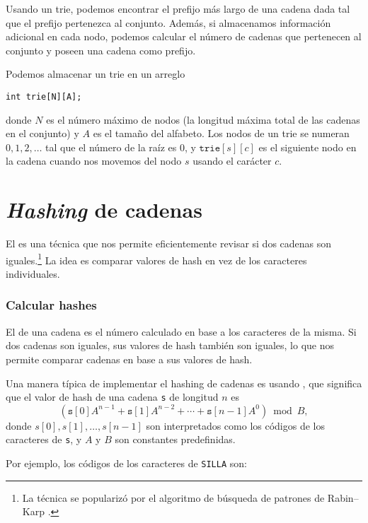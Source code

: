 Usando un trie, podemos encontrar el prefijo más largo de una cadena dada
tal que el prefijo pertenezca al conjunto. Además, si almacenamos
información adicional en cada nodo, podemos calcular el número de cadenas
que pertenecen al conjunto y poseen una cadena como prefijo.

\pagebreak \noindent
Podemos almacenar un trie en un arreglo
\begin{lstlisting}
int trie[N][A];
\end{lstlisting}
donde $N$ es el número máximo de nodos (la longitud máxima total
de las cadenas en el conjunto) y $A$ es el tamaño del alfabeto.
Los nodos de un trie se numeran $0,1,2,\ldots$ tal que el número de la
raíz es 0, y $\texttt{trie}[s][c]$ es el siguiente nodo en la cadena
cuando nos movemos del nodo $s$ usando el carácter $c$.

\section{\textit{Hashing} de cadenas}


El  es una técnica que nos permite
eficientemente revisar si dos cadenas son iguales.\footnote{La técnica se
    popularizó por el algoritmo de búsqueda de patrones de
    Rabin--Karp \cite{kar87}.}
La idea es comparar valores de hash en vez de los caracteres individuales.

\subsubsection*{Calcular hashes}

El  de una cadena es el número calculado en base a
los caracteres de la misma. Si dos cadenas son iguales, sus valores de
hash también son iguales, lo que nos permite comparar cadenas en base
a sus valores de hash.

Una manera típica de implementar el hashing de cadenas es usando
, que significa que el valor de hash de una cadena
\texttt{s} de longitud $n$ es
\[(\texttt{s}[0] A^{n-1} + \texttt{s}[1] A^{n-2} + \cdots + \texttt{s}[n-1] A^0) \bmod B  ,\]
donde $s[0],s[1],\ldots,s[n-1]$ son interpretados como los códigos de
los caracteres de \texttt{s}, y $A$ y $B$ son constantes predefinidas.

Por ejemplo, los códigos de los caracteres de \texttt{SILLA} son:
\begin{center}
\end{center}

